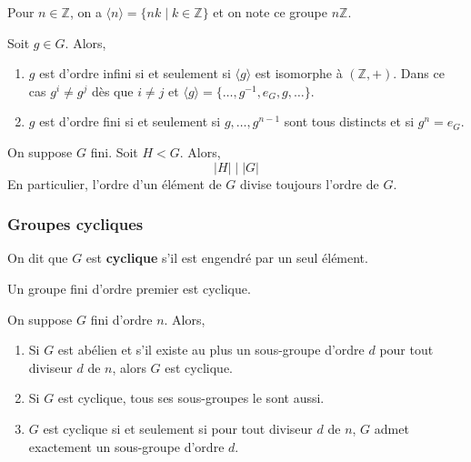   \begin{example}
    Pour $n \in \mathbb{Z}$, on a $\langle n \rangle = \{ nk \mid k \in \mathbb{Z} \}$ et on note ce groupe $n\mathbb{Z}$.
  \end{example}


  \begin{theorem}
    \label{104-1}
    Soit $g \in G$. Alors,
    \begin{enumerate}[label=(\roman*)]
      \item $g$ est d'ordre infini si et seulement si $\langle g \rangle$ est isomorphe à $(\mathbb{Z}, +)$. Dans ce cas $g^i \neq g^j$ dès que $i \neq j$ et $\langle g \rangle = \{ \dots, g^{-1}, e_G, g, \dots \}$.
      \item \label{104-2} $g$ est d'ordre fini si et seulement si $g, \dots, g^{n-1}$ sont tous distincts et si $g^n = e_G$.
    \end{enumerate}
  \end{theorem}


  \begin{theorem}[Lagrange]
    On suppose $G$ fini. Soit $H < G$. Alors,
    \[ |H| \mid |G| \]
    En particulier, l'ordre d'un élément de $G$ divise toujours l'ordre de $G$.
  \end{theorem}

  \subsubsection{Groupes cycliques}


  \begin{definition}
    On dit que $G$ est \textbf{cyclique} s'il est engendré par un seul élément.
  \end{definition}


  \begin{proposition}
    Un groupe fini d'ordre premier est cyclique.
  \end{proposition}

  \begin{theorem}
    On suppose $G$ fini d'ordre $n$. Alors,
    \begin{enumerate}[label=(\roman*)]
      \item Si $G$ est abélien et s'il existe au plus un sous-groupe d'ordre $d$ pour tout diviseur $d$ de $n$, alors $G$ est cyclique.
      \item Si $G$ est cyclique, tous ses sous-groupes le sont aussi.
      \item $G$ est cyclique si et seulement si pour tout diviseur $d$ de $n$, $G$ admet exactement un sous-groupe d'ordre $d$.
    \end{enumerate}
  \end{theorem}

